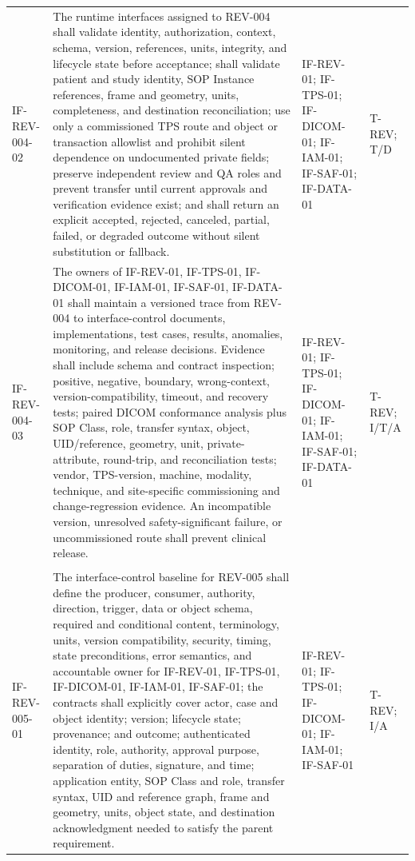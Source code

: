\documentclass[11pt,letterpaper]{article}
\begin{document}
\begin{scriptsize}
\begin{longtable}{@{}L{0.14\textwidth}L{0.49\textwidth}L{0.19\textwidth}L{0.10\textwidth}@{}}
\addlinespace[2pt]
\mbox{IF-REV-004-02} & The runtime interfaces assigned to REV-004 shall validate identity, authorization, context, schema, version, references, units, integrity, and lifecycle state before acceptance; shall validate patient and study identity, SOP Instance references, frame and geometry, units, completeness, and destination reconciliation; use only a commissioned TPS route and object or transaction allowlist and prohibit silent dependence on undocumented private fields; preserve independent review and QA roles and prevent transfer until current approvals and verification evidence exist; and shall return an explicit accepted, rejected, canceled, partial, failed, or degraded outcome without silent substitution or fallback. & IF-REV-01; IF-TPS-01; IF-DICOM-01; IF-IAM-01; IF-SAF-01; IF-DATA-01 & T-REV; T\slash\allowbreak{}D \\
\addlinespace[2pt]
\mbox{IF-REV-004-03} & The owners of IF-REV-01, IF-TPS-01, IF-DICOM-01, IF-IAM-01, IF-SAF-01, IF-DATA-01 shall maintain a versioned trace from REV-004 to interface-control documents, implementations, test cases, results, anomalies, monitoring, and release decisions. Evidence shall include schema and contract inspection; positive, negative, boundary, wrong-context, version-compatibility, timeout, and recovery tests; paired DICOM conformance analysis plus SOP Class, role, transfer syntax, object, UID\slash\allowbreak{}reference, geometry, unit, private-attribute, round-trip, and reconciliation tests; vendor, TPS-version, machine, modality, technique, and site-specific commissioning and change-regression evidence. An incompatible version, unresolved safety-significant failure, or uncommissioned route shall prevent clinical release. & IF-REV-01; IF-TPS-01; IF-DICOM-01; IF-IAM-01; IF-SAF-01; IF-DATA-01 & T-REV; I\slash\allowbreak{}T\slash\allowbreak{}A \\
\addlinespace[2pt]
 \\
\addlinespace[2pt]
\mbox{IF-REV-005-01} & The interface-control baseline for REV-005 shall define the producer, consumer, authority, direction, trigger, data or object schema, required and conditional content, terminology, units, version compatibility, security, timing, state preconditions, error semantics, and accountable owner for IF-REV-01, IF-TPS-01, IF-DICOM-01, IF-IAM-01, IF-SAF-01; the contracts shall explicitly cover actor, case and object identity; version; lifecycle state; provenance; and outcome; authenticated identity, role, authority, approval purpose, separation of duties, signature, and time; application entity, SOP Class and role, transfer syntax, UID and reference graph, frame and geometry, units, object state, and destination acknowledgment needed to satisfy the parent requirement. & IF-REV-01; IF-TPS-01; IF-DICOM-01; IF-IAM-01; IF-SAF-01 & T-REV; I\slash\allowbreak{}A \\

\end{longtable}
\end{scriptsize}
\end{document}
